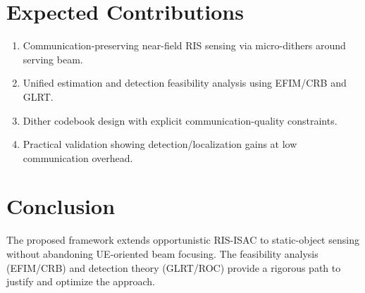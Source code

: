\documentclass[11pt,a4paper]{article}
\begin{document}
\section{Expected Contributions}
\begin{enumerate}
\item Communication-preserving near-field RIS sensing via micro-dithers around serving beam.
\item Unified estimation and detection feasibility analysis using EFIM/CRB and GLRT.
\item Dither codebook design with explicit communication-quality constraints.
\item Practical validation showing detection/localization gains at low communication overhead.
\end{enumerate}

\section{Conclusion}
The proposed framework extends opportunistic RIS-ISAC to static-object sensing without abandoning UE-oriented beam focusing. The feasibility analysis (EFIM/CRB) and detection theory (GLRT/ROC) provide a rigorous path to justify and optimize the approach.
\end{document}
